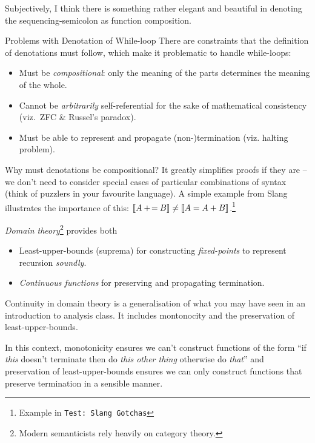 Subjectively, I think there is something rather elegant and beautiful in
denoting the sequencing-semicolon as function composition.

\begin{frame}{Problems with Denotation of While-loop}
    There are constraints that the definition of denotations must follow,
    which make it problematic to handle while-loops:
    \pause
    \begin{itemize}[<+->]
        \item Must be \emph{compositional}: only the meaning of the parts
            determines the meaning of the whole.
        \item Cannot be \emph{arbitrarily} self-referential for the
            sake of mathematical consistency (viz.~ZFC \& Russel's paradox).
        \item Must be able to represent and propagate (non-)termination (viz.
            halting problem).
    \end{itemize}
\end{frame}

Why must denotations be compositional? It greatly simplifies proofs if they
are -- we don't need to consider special cases of particular combinations of
syntax (think of puzzlers in your favourite language). A simple example from
Slang illustrates the importance of this: $\mathcal{} [\![ A \mathbin{+\!=} B ]\!] \neq
\mathcal{} [\![ A = A + B ]\!]$.\footnote{Example in \texttt{\frenchspacing Test:\ Slang Gotchas}}

\begin{frame}
    \emph{Domain theory}\footnote{Modern semanticists rely heavily on category theory.} provides both
    \pause
    \begin{itemize}[<+->]
        \item Least-upper-bounds (suprema) for constructing \emph{fixed-points} to represent recursion \emph{soundly}.
        \item \emph{Continuous functions} for preserving and propagating termination.
    \end{itemize}
\end{frame}

Continuity in domain theory is a generalisation of what you may have seen in
an introduction to analysis class. It includes montonocity and the
preservation of least-upper-bounds.

In this context, monotonicity ensures we can't construct functions of the
form ``if \emph{this} doesn't terminate then do \emph{this other thing}
otherwise do \emph{that}'' and preservation of least-upper-bounds ensures we
can only construct functions that preserve termination in a sensible manner.

